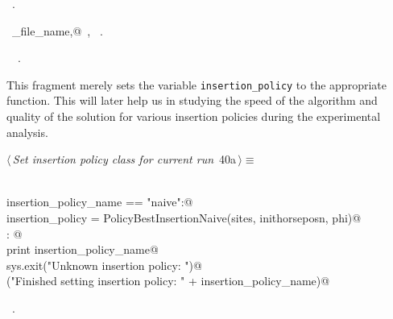 \documentclass[11.5pt]{report}
\begin{document}
\begin{flushleft}
\begin{list}{}{}
\mbox{}\verb@@{\NWsep}
\end{list}
\vspace{-1.5ex}
\footnotesize
\begin{list}{}{\setlength{\itemsep}{-\parsep}\setlength{\itemindent}{-\leftmargin}}
\item \NWtxtMacroRefIn\ .
\item \NWtxtIdentsDefed\nobreak\  \verb@io_file_name,@\nobreak\ , \verb@logger@\nobreak\ .\item \NWtxtIdentsUsed\nobreak\  \verb@greedy@\nobreak\ .
\item{}
\end{list}
\vspace{4ex}
\end{flushleft}

\vspace{-0.8cm}\newchunk This fragment merely sets the variable \verb|insertion_policy| to 
the appropriate function. This will later help us in studying the speed of 
the algorithm and quality of the solution for various insertion policies 
during the experimental analysis. 

\begin{flushleft} \small\label{scrap48}\raggedright\small
{} $\langle\,${\itshape Set insertion policy class for current run}\nobreak\ {\footnotesize {40a}}$\,\rangle\equiv$
\vspace{-1ex}
\begin{list}{}{} \item
\mbox{}\verb@@\\
\mbox{}\verb@if insertion_policy_name == "naive":@\\
\mbox{}\verb@     insertion_policy = PolicyBestInsertionNaive(sites, inithorseposn, phi)@\\
\mbox{}\verb@else: @\\
\mbox{}\verb@     print insertion_policy_name@\\
\mbox{}\verb@     sys.exit("Unknown insertion policy: ")@\\
\mbox{}\verb@debug("Finished setting insertion policy: " + insertion_policy_name)@\\
\mbox{}\verb@@{\NWsep}
\end{list}
\vspace{-1.5ex}
\footnotesize
\begin{list}{}{\setlength{\itemsep}{-\parsep}\setlength{\itemindent}{-\leftmargin}}
\item \NWtxtMacroRefIn\ .

\item{}
\end{list}
\vspace{4ex}
\end{flushleft}
\end{document}
